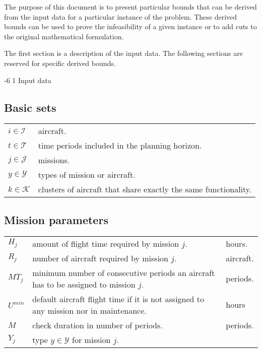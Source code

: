 \documentclass[a4paper,onecolumn,fleqn]{article}
\makeatletter
\renewcommand\section{\@startsection{section}{1}{\z@}%
                       {-6\p@ \@plus -0\p@ \@minus -0\p@}%
                       {2\p@ \@plus 0\p@ \@minus 0\p@}%
                       {\normalsize\textbf}}
\renewcommand\section{\@startsection{section}{2}{\z@}%
                       {-6\p@ \@plus -0\p@ \@minus -0\p@}%
                       {2\p@ \@plus 0\p@ \@minus 0\p@}%
                       {\normalsize\textbf}}
\renewcommand\section{\@startsection{section}{3}{\z@}%
                       {-6\p@ \@plus -0\p@ \@minus -0\p@}%
                       {1\p@ \@plus 0\p@ \@minus 0\p@}%
                       {\normalsize\itshape\bfseries}}
\makeatother
\begin{document}
The purpose of this document is to present particular bounds that can be derived from the input data for a particular instance of the problem. These derived bounds can be used to prove the infeasibility of a given instance or to add cuts to the original mathematical formulation.

The first section is a description of the input data. The following sections are reserved for specific derived bounds.

\section{Input data}
    \subsection{Basic sets}

        \begin{tabular}{p{15mm}p{140mm}}
            $i \in \mathcal{I}$     &  aircraft. \\
            $t \in \mathcal{T}$     &  time periods included in the planning horizon. \\
            $j \in \mathcal{J}$     &  missions. \\
            $y \in \mathcal{Y}$     &  types of mission or aircraft. \\
            $k \in \mathcal{K}$     &  clusters of aircraft that share exactly the same functionality. \\
        \end{tabular}

    \subsection{Mission parameters}

        \begin{tabular}{p{15mm}p{125mm}p{15mm}}
            $H_j$             & amount of flight time required by mission $j$. & hours. \\
            $R_j$             & number of aircraft required by mission $j$. & aircraft. \\
            $MT_j$            & minimum number of consecutive periods an aircraft has to be assigned to mission $j$. & periods. \\
            $U^{min}$         & default aircraft flight time if it is not assigned to any mission nor in maintenance.& hours \\
            $M$               & check duration in number of periods. & periods. \\
            $Y_j$             & type $y \in \mathcal{Y}$ for mission $j$. \\
        \end{tabular}
\end{document}
